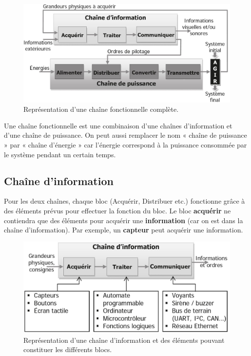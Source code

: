 \documentclass[
	11pt, %
	fleqn, %
	a4paper, %
]{LegrandOrangeBook}
\begin{document}
\begin{figure}[H] %
	\centering %
	\includegraphics[width=1.1\textwidth]{Images/chaine1.JPG} %
	\caption{Représentation d'une chaîne fonctionnelle complète.}
	\label{chaine1} %
\end{figure}

Une chaîne fonctionnelle est une combinaison d'une chaînes d’information et d'une chaîne de puissance. On peut aussi remplacer le nom « chaîne de puissance » par « chaîne d’énergie » car l’énergie correspond à la puissance consommée par le système pendant un certain temps.

\subsection{Chaîne d'information}
Pour les deux chaînes, chaque bloc (Acquérir, Distribuer etc.) fonctionne grâce à des éléments prévus pour effectuer la fonction du bloc. Le bloc \textbf{acquérir} ne contiendra que des éléments pour acquérir une \textbf{information} (car on est dans la chaîne d'information). Par exemple, un \textbf{capteur} peut acquérir une information.
\begin{figure}[H] %
	\centering %
	\includegraphics[width=1\textwidth]{Images/chaine2.JPG} %
	\caption{Représentation d'une chaîne d'information et des éléments pouvant constituer les différents blocs.}
	\label{chaine2} %
\end{figure}
\end{document}
